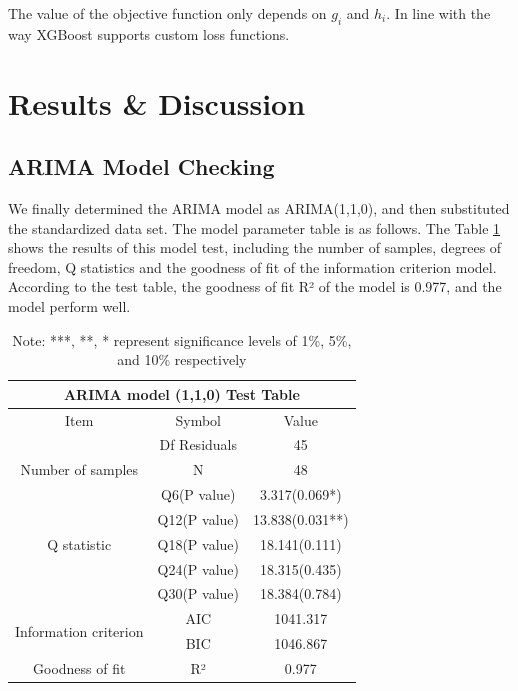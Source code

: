 \documentclass[a4paper]{jpconf}
\begin{document}
The value of the objective function only depends on $g_i$ and $h_i $. In line with the way XGBoost supports custom loss functions.




\section{Results \& Discussion}



\subsection{ARIMA Model Checking}
We finally determined the ARIMA model as ARIMA(1,1,0), and then substituted the standardized data set. The model parameter table is as follows. The Table \ref{A} shows the results of this model test, including the number of samples, degrees of freedom, Q statistics and the goodness of fit of the information criterion model. According to the test table, the goodness of fit R² of the model is 0.977, and the model perform well.
\begin{table}[]
\centering
\begin{tabular}{|ccc|}
\hline
\multicolumn{3}{|c|}{ARIMA   model (1,1,0) Test Table}                                          \\ \hline
\multicolumn{1}{|c|}{Item}              & \multicolumn{1}{c|}{Symbol}         & Value           \\ \hline
\multicolumn{1}{|c|}{}                  & \multicolumn{1}{c|}{Df   Residuals} & 45              \\ \hline
\multicolumn{1}{|c|}{Number of samples} & \multicolumn{1}{c|}{N}              & 48              \\ \hline
\multicolumn{1}{|c|}{\multirow{5}{*}{Q statistic}}           & \multicolumn{1}{c|}{Q6(P   value)} & 3.317(0.069*) \\ \cline{2-3} 
\multicolumn{1}{|c|}{}                  & \multicolumn{1}{c|}{Q12(P value)}   & 13.838(0.031**) \\ \cline{2-3} 
\multicolumn{1}{|c|}{}                  & \multicolumn{1}{c|}{Q18(P value)}   & 18.141(0.111)   \\ \cline{2-3} 
\multicolumn{1}{|c|}{}                  & \multicolumn{1}{c|}{Q24(P value)}   & 18.315(0.435)   \\ \cline{2-3} 
\multicolumn{1}{|c|}{}                  & \multicolumn{1}{c|}{Q30(P value)}   & 18.384(0.784)   \\ \hline
\multicolumn{1}{|c|}{\multirow{2}{*}{Information criterion}} & \multicolumn{1}{c|}{AIC}           & 1041.317      \\ \cline{2-3} 
\multicolumn{1}{|c|}{}                  & \multicolumn{1}{c|}{BIC}            & 1046.867        \\ \hline
\multicolumn{1}{|c|}{Goodness of fit}   & \multicolumn{1}{c|}{R²}             & 0.977           \\ \hline
\end{tabular}
\caption{\label{A}Note: ***, **, * represent significance levels of 1\%, 5\%, and 10\% respectively}
\end{table}
\end{document}
